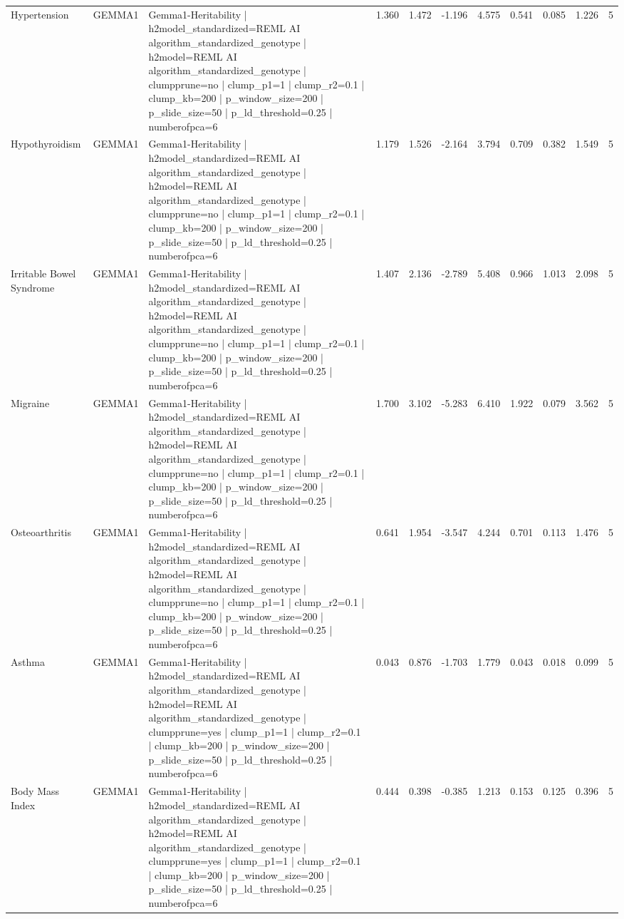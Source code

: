 \begin{landscape}
\begin{longtable}{p{2.4cm}p{1.8cm}p{6.0cm}rrrrrrrr}
Hypertension & GEMMA1 & Gemma1-Heritability | h2model\_standardized=REML AI algorithm\_standardized\_genotype | h2model=REML AI algorithm\_standardized\_genotype | clumpprune=no | clump\_p1=1 | clump\_r2=0.1 | clump\_kb=200 | p\_window\_size=200 | p\_slide\_size=50 | p\_ld\_threshold=0.25 | numberofpca=6 & 1.360 & 1.472 & -1.196 & 4.575 & 0.541 & 0.085 & 1.226 & 5 \\
Hypothyroidism & GEMMA1 & Gemma1-Heritability | h2model\_standardized=REML AI algorithm\_standardized\_genotype | h2model=REML AI algorithm\_standardized\_genotype | clumpprune=no | clump\_p1=1 | clump\_r2=0.1 | clump\_kb=200 | p\_window\_size=200 | p\_slide\_size=50 | p\_ld\_threshold=0.25 | numberofpca=6 & 1.179 & 1.526 & -2.164 & 3.794 & 0.709 & 0.382 & 1.549 & 5 \\
Irritable Bowel Syndrome & GEMMA1 & Gemma1-Heritability | h2model\_standardized=REML AI algorithm\_standardized\_genotype | h2model=REML AI algorithm\_standardized\_genotype | clumpprune=no | clump\_p1=1 | clump\_r2=0.1 | clump\_kb=200 | p\_window\_size=200 | p\_slide\_size=50 | p\_ld\_threshold=0.25 | numberofpca=6 & 1.407 & 2.136 & -2.789 & 5.408 & 0.966 & 1.013 & 2.098 & 5 \\
Migraine & GEMMA1 & Gemma1-Heritability | h2model\_standardized=REML AI algorithm\_standardized\_genotype | h2model=REML AI algorithm\_standardized\_genotype | clumpprune=no | clump\_p1=1 | clump\_r2=0.1 | clump\_kb=200 | p\_window\_size=200 | p\_slide\_size=50 | p\_ld\_threshold=0.25 | numberofpca=6 & 1.700 & 3.102 & -5.283 & 6.410 & 1.922 & 0.079 & 3.562 & 5 \\
Osteoarthritis & GEMMA1 & Gemma1-Heritability | h2model\_standardized=REML AI algorithm\_standardized\_genotype | h2model=REML AI algorithm\_standardized\_genotype | clumpprune=no | clump\_p1=1 | clump\_r2=0.1 | clump\_kb=200 | p\_window\_size=200 | p\_slide\_size=50 | p\_ld\_threshold=0.25 | numberofpca=6 & 0.641 & 1.954 & -3.547 & 4.244 & 0.701 & 0.113 & 1.476 & 5 \\
Asthma & GEMMA1 & Gemma1-Heritability | h2model\_standardized=REML AI algorithm\_standardized\_genotype | h2model=REML AI algorithm\_standardized\_genotype | clumpprune=yes | clump\_p1=1 | clump\_r2=0.1 | clump\_kb=200 | p\_window\_size=200 | p\_slide\_size=50 | p\_ld\_threshold=0.25 | numberofpca=6 & 0.043 & 0.876 & -1.703 & 1.779 & 0.043 & 0.018 & 0.099 & 5 \\
Body Mass Index & GEMMA1 & Gemma1-Heritability | h2model\_standardized=REML AI algorithm\_standardized\_genotype | h2model=REML AI algorithm\_standardized\_genotype | clumpprune=yes | clump\_p1=1 | clump\_r2=0.1 | clump\_kb=200 | p\_window\_size=200 | p\_slide\_size=50 | p\_ld\_threshold=0.25 | numberofpca=6 & 0.444 & 0.398 & -0.385 & 1.213 & 0.153 & 0.125 & 0.396 & 5 \\

\end{longtable}
\end{landscape}
